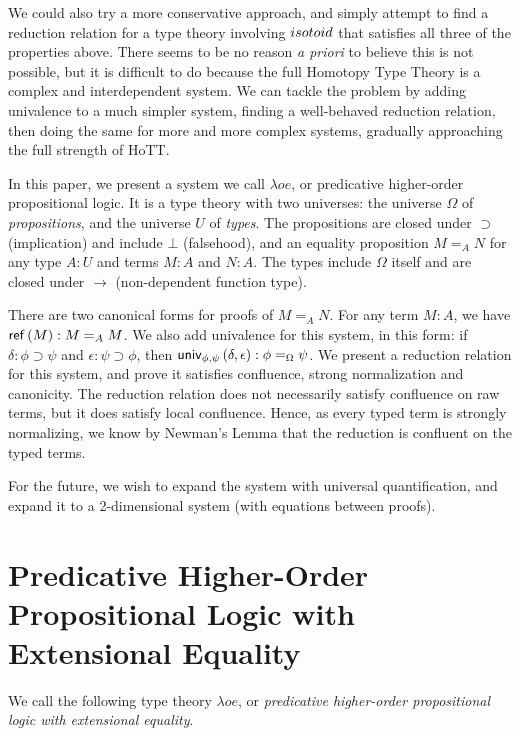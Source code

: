 We could also try a more conservative approach, and simply attempt to find a reduction relation for a type theory involving $isotoid$ that satisfies
all three of the properties above.  There seems to be no reason \emph{a priori} to believe this is not possible, but it is difficult to do because
the full Homotopy Type Theory is a complex and interdependent system.  We can tackle the problem by adding univalence to a much simpler system, finding
a well-behaved reduction relation, then doing the same for more and more complex systems, gradually approaching the full strength of HoTT.

In this paper, we present a system we call $\lambda o e$, or predicative higher-order propositional logic.  It is a type theory with two universes: the universe $\Omega$
of \emph{propositions}, and the universe $U$ of \emph{types}.  The propositions are closed under $\supset$ (implication) and include $\bot$ (falsehood), and an equality proposition $M =_A N$ for
any type $A : U$ and terms $M : A$ and $N : A$.  The types include $\Omega$ itself and are closed under $\rightarrow$ (non-dependent function type).

There are two canonical forms for proofs of $M =_A N$.  For any term $M : A$, we have $\mathsf{ref} \left( {M} \right) : M =_A M$.  We also add univalence for this system, in this form:
if $\delta : \phi \supset \psi$ and $\epsilon : \psi \supset\phi$, then $\mathsf{univ}_{{\phi} , {\psi}} \left( {\delta} , {\epsilon} \right) : \phi =_\Omega \psi$.  We present a reduction relation for this system, and prove it satisfies confluence, strong normalization and canonicity.   The reduction relation does not necessarily satisfy confluence on raw terms, but it does satisfy local confluence.  Hence, as
every typed term is strongly normalizing, we know by Newman's Lemma that the reduction is confluent on the typed terms.

For the future, we wish to expand the system with universal quantification, and expand it to a 2-dimensional system (with equations between proofs).


\section{Predicative Higher-Order Propositional Logic with Extensional Equality}

We call the following type theory $\lambda o e$, or \emph{predicative higher-order propositional logic with extensional equality}.  

